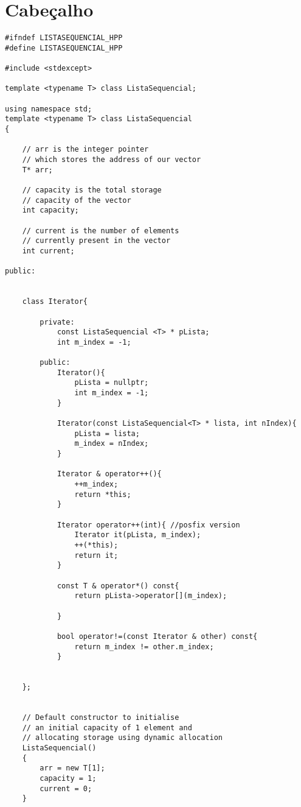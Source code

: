 \section{Cabeçalho}


\begin{verbatim}
#ifndef LISTASEQUENCIAL_HPP
#define LISTASEQUENCIAL_HPP

#include <stdexcept>

template <typename T> class ListaSequencial;

using namespace std;
template <typename T> class ListaSequencial
{
 
    // arr is the integer pointer
    // which stores the address of our vector
    T* arr;
 
    // capacity is the total storage
    // capacity of the vector
    int capacity;
 
    // current is the number of elements
    // currently present in the vector
    int current;
 
public:
    
    
    class Iterator{

        private:
            const ListaSequencial <T> * pLista;
            int m_index = -1;

        public:
            Iterator(){
                pLista = nullptr;
                int m_index = -1;
            }      

            Iterator(const ListaSequencial<T> * lista, int nIndex){
                pLista = lista;
                m_index = nIndex;
            }

            Iterator & operator++(){
                ++m_index;
                return *this;
            }

            Iterator operator++(int){ //posfix version
                Iterator it(pLista, m_index);
                ++(*this);
                return it;
            }

            const T & operator*() const{
                return pLista->operator[](m_index);

            } 

            bool operator!=(const Iterator & other) const{
                return m_index != other.m_index;
            }


    };

    
    // Default constructor to initialise
    // an initial capacity of 1 element and
    // allocating storage using dynamic allocation
    ListaSequencial()
    {
        arr = new T[1];
        capacity = 1;
        current = 0;
    }


\end{verbatim}

